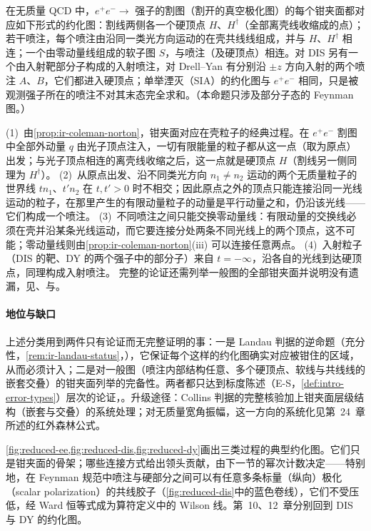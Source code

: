 \begin{proposition}\label{prop:ir-pinch-classification}
在无质量 QCD 中，$e^+e^-\to$ 强子的割图（割开的真空极化图）的每个钳夹面都对应如下形式的约化图：割线两侧各一个硬顶点 $H$、$H^\dagger$（全部离壳线收缩成的点）；若干喷注，每个喷注由沿同一类光方向运动的在壳共线线组成，并与 $H$、$H^\dagger$ 相连；一个由零动量线组成的软子图 $S$，与喷注（及硬顶点）相连。对 DIS 另有一个由入射靶部分子构成的入射喷注，对 Drell--Yan 有分别沿 $\pm z$ 方向入射的两个喷注 $A$、$B$，它们都进入硬顶点；单举湮灭（SIA）的约化图与 $e^+e^-$ 相同，只是被观测强子所在的喷注不对其末态完全求和。（本命题只涉及部分子态的 Feynman 图。）
\end{proposition}
\begin{proofsketch}
(1)~由\cref{prop:ir-coleman-norton}，钳夹面对应在壳粒子的经典过程。在 $e^+e^-$ 割图中全部外动量 $q$ 由光子顶点注入，一切有限能量的粒子都从这一点（取为原点）出发；与光子顶点相连的离壳线收缩之后，这一点就是硬顶点 $H$（割线另一侧同理为 $H^\dagger$）。
(2)~从原点出发、沿不同类光方向 $n_1\ne n_2$ 运动的两个无质量粒子的世界线 $tn_1$、$t'n_2$ 在 $t,t'>0$ 时不相交；因此原点之外的顶点只能连接沿同一光线运动的粒子，在那里产生的有限动量粒子的动量是平行动量之和，仍沿该光线——它们构成一个喷注。
(3)~不同喷注之间只能交换零动量线：有限动量的交换线必须在壳并沿某条光线运动，而它要连接分处两条不同光线上的两个顶点，这不可能；零动量线则由\cref{prop:ir-coleman-norton}(iii) 可以连接任意两点。
(4)~入射粒子（DIS 的靶、DY 的两个强子中的部分子）来自 $t=-\infty$，沿各自的光线到达硬顶点，同理构成入射喷注。
完整的论证还需列举一般图的全部钳夹面并说明没有遗漏，见\cite{Sterman1978a,Sterman1978b,LibbySterman1978a}、\cite[第~13~章]{Sterman1993}与\cite[第~5~章]{Collins2011}。
\end{proofsketch}

\paragraph{地位与缺口}
上述分类用到两件只有论证而无完整证明的事：一是 Landau 判据的逆命题（充分性，\cref{rem:ir-landau-status}，\tagA），它保证每个这样的约化图确实对应被钳住的区域，从而必须计入；二是对一般图（喷注内部结构任意、多个硬顶点、软线与共线线的嵌套交叠）的钳夹面列举的完备性。两者都只达到标度陈述（E-S，\cref{def:intro-error-types}）层次的论证\cite{Sterman1978a,LibbySterman1978a}，\cite[第~5~章]{Collins2011}。升级途径：Collins 判据的完整核验加上钳夹面层级结构（嵌套与交叠）的系统处理；对无质量宽角振幅，这一方向的系统化见第~24~章所述的红外森林公式。

\cref{fig:reduced-ee,fig:reduced-dis,fig:reduced-dy}画出三类过程的典型约化图。它们只是钳夹面的骨架；哪些连接方式给出领头贡献，由下一节的幂次计数决定——特别地，在 Feynman 规范中喷注与硬部分之间可以有任意多条标量（纵向）极化（scalar polarization）的共线胶子（\cref{fig:reduced-dis}中的蓝色卷线），它们不受压低，经 Ward 恒等式成为算符定义中的 Wilson 线。第~10、12~章分别回到 DIS 与 DY 的约化图。
